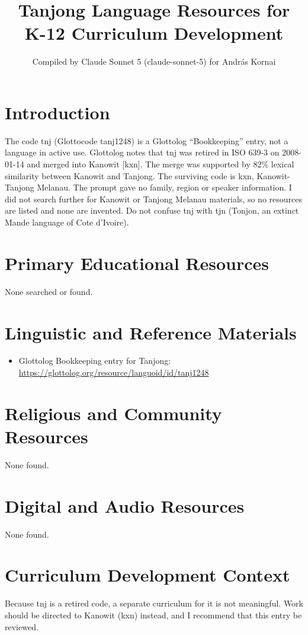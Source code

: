 \documentclass[12pt]{article}
\title{Tanjong Language Resources for K-12 Curriculum Development}
\author{Compiled by Claude Sonnet 5 (claude-sonnet-5) for Andr\'as Kornai}
\date{}
\begin{document}
\maketitle

\section{Introduction}
The code tnj (Glottocode tanj1248) is a Glottolog ``Bookkeeping'' entry, not a language in active use. Glottolog notes that tnj was retired in ISO 639-3 on 2008-01-14 and merged into Kanowit [kxn]. The merge was supported by 82\% lexical similarity between Kanowit and Tanjong. The surviving code is kxn, Kanowit-Tanjong Melanau. The prompt gave no family, region or speaker information. I did not search further for Kanowit or Tanjong Melanau materials, so no resources are listed and none are invented. Do not confuse tnj with tjn (Tonjon, an extinct Mande language of Cote d'Ivoire).

\section{Primary Educational Resources}
None searched or found.

\section{Linguistic and Reference Materials}
\begin{itemize}
\item Glottolog Bookkeeping entry for Tanjong: \url{https://glottolog.org/resource/languoid/id/tanj1248}
\end{itemize}

\section{Religious and Community Resources}
None found.

\section{Digital and Audio Resources}
None found.

\section{Curriculum Development Context}
Because tnj is a retired code, a separate curriculum for it is not meaningful. Work should be directed to Kanowit (kxn) instead, and I recommend that this entry be reviewed.
\end{document}
